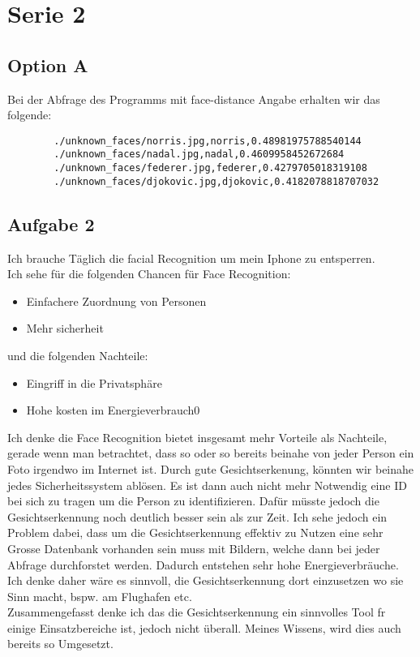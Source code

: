 \documentclass[10pt]{article}
\newcommand{\heading}[2]{\setcounter{section}{#2}\section*{#1 #2}}
\newcommand{\problem}[1]{\subsection{#1}}
\begin{document}
    \heading{Serie}{2}
    \problem{Option A}
    Bei der Abfrage des Programms mit face-distance Angabe erhalten wir das folgende:
    \begin{lstlisting}
        ./unknown_faces/norris.jpg,norris,0.48981975788540144
        ./unknown_faces/nadal.jpg,nadal,0.4609958452672684
        ./unknown_faces/federer.jpg,federer,0.4279705018319108
        ./unknown_faces/djokovic.jpg,djokovic,0.4182078818707032

    \end{lstlisting}


    \problem{Aufgabe 2}
        Ich brauche Täglich die facial Recognition um mein Iphone zu entsperren. \\

        Ich sehe für die folgenden Chancen für Face Recognition:
        \begin{itemize}
         \item Einfachere Zuordnung von Personen
         \item Mehr sicherheit
        \end{itemize}

        und die folgenden Nachteile:
        \begin{itemize}
         \item Eingriff in die Privatsphäre
         \item Hohe kosten im Energieverbrauch0
        \end{itemize}

        Ich denke die Face Recognition bietet insgesamt mehr Vorteile als Nachteile, gerade wenn man betrachtet, dass so oder so bereits beinahe von jeder Person ein Foto irgendwo im Internet ist. Durch gute Gesichtserkenung, könnten wir beinahe jedes Sicherheitssystem ablösen. Es ist dann auch nicht mehr Notwendig eine ID bei sich zu tragen um die Person zu identifizieren. Dafür müsste jedoch die Gesichtserkennung noch deutlich besser sein als zur Zeit. Ich sehe jedoch ein Problem dabei, dass um die Gesichtserkennung effektiv zu Nutzen eine sehr Grosse Datenbank vorhanden sein muss mit Bildern, welche dann bei jeder Abfrage durchforstet werden. Dadurch entstehen sehr hohe Energieverbräuche. Ich denke daher wäre es sinnvoll, die Gesichtserkennung dort einzusetzen wo sie Sinn macht, bspw. am Flughafen etc.\\
        Zusammengefasst denke ich das die Gesichtserkennung ein sinnvolles Tool fr einige Einsatzbereiche ist, jedoch nicht überall. Meines Wissens, wird dies auch bereits so Umgesetzt.
\end{document}
